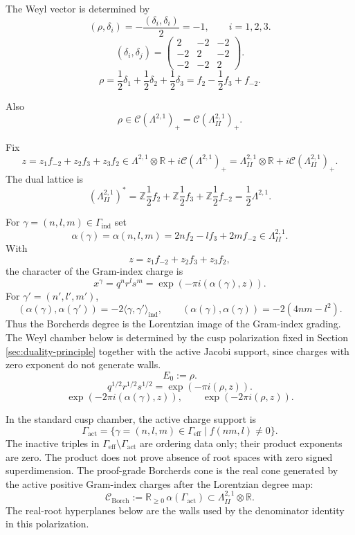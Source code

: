 \documentclass[11pt]{memoir}
\newcommand{\Z}{\mathbb{Z}} \newcommand{\C}{\mathbb{C}}
\newcommand{\R}{\mathbb{R}} \newcommand{\La}{\Lambda}
\newcommand{\Cone}{\mathcal{C}}
\begin{document}
The Weyl vector is determined by
$$ (\rho,\delta_i)=-\frac{(\delta_i,\delta_i)}{2}=-1,\qquad i=1,2,3.$$
$$(\delta_i,\delta_j) =
\begin{pmatrix}2 & -2 & -2\\-2 & 2 & -2\\-2 & -2 & 2\end{pmatrix}.$$
$$\rho = \frac{1}{2}\delta_1 + \frac{1}{2}\delta_2 + \frac{1}{2}\delta_3 = f_2 - \frac{1}{2}f_3 + f_{-2}.$$

Also
$$\rho \in
\Cone(\La^{2,1})_+ = \Cone(\La^{2,1}_{II})_+.$$

Fix
$$z = z_1 f_{-2} + z_2 f_3 + z_3 f_2
\in \La^{2,1} \otimes \R + i\Cone(\La^{2,1})_+
= \La^{2,1}_{II} \otimes \R + i\Cone(\La^{2,1}_{II})_+.$$
The dual lattice is
$$(\La^{2,1}_{II})^* = \Z \frac{1}{2} f_2 + \Z \frac{1}{2} f_3 + \Z \frac{1}{2} f_{-2} = \frac{1}{2}\La^{2,1}.$$

\begin{definition}
For $\gamma=(n,l,m)\in\Gamma_{\mathrm{ind}}$ set
$$\alpha(\gamma)=\alpha(n,l,m)=2nf_2-lf_3+2mf_{-2}
\in\La^{2,1}_{II}.$$
With
$$z=z_1f_{-2}+z_2f_3+z_3f_2,$$
the character of the Gram-index charge is
$$x^\gamma=q^nr^ls^m=\exp(-\pi i(\alpha(\gamma),z)).$$
For $\gamma'=(n',l',m')$,
$$
(\alpha(\gamma),\alpha(\gamma'))
=-2\langle\gamma,\gamma'\rangle_{\mathrm{ind}},
\qquad
(\alpha(\gamma),\alpha(\gamma))=-2(4nm-l^2).
$$
Thus the Borcherds degree is the Lorentzian image of the Gram-index
grading.  The Weyl chamber below is determined by the cusp polarization
fixed in Section \ref{sec:duality-principle} together with the active
Jacobi support, since charges with zero exponent do not generate walls.
$$E_0:=\rho.$$
$$q^{1/2}r^{1/2}s^{1/2}=\exp(-\pi i(\rho,z)).$$
$$\exp(-2\pi i(\alpha(\gamma),z)),\qquad
\exp(-2\pi i(\rho,z)).$$
\end{definition}

\begin{definition}
In the standard cusp chamber, the active charge support is
$$
\Gamma_{\mathrm{act}}
=\{\gamma=(n,l,m)\in\Gamma_{\mathrm{eff}}\mid f(nm,l)\neq0\}.
$$
The inactive triples in $\Gamma_{\mathrm{eff}}\setminus\Gamma_{\mathrm{act}}$
are ordering data only; their product exponents are zero.  The product
does not prove absence of root spaces with zero signed superdimension.
The proof-grade Borcherds cone is the real cone generated by the active
positive Gram-index charges after the Lorentzian degree map:
$$
\Cone_{\mathrm{Borch}}
:=\R_{\geq0}\,\alpha(\Gamma_{\mathrm{act}})
\subset \La^{2,1}_{II}\otimes\R.
$$
The real-root hyperplanes below are the walls used by the denominator
identity in this polarization.
\end{definition}
\end{document}
